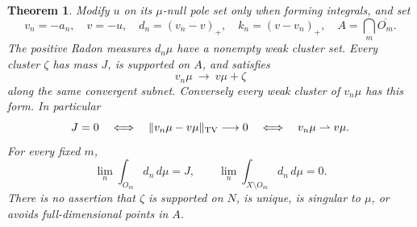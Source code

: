 \documentclass[11pt]{article}
\newtheorem{theorem}{Theorem}
\begin{document}
\begin{theorem}\label{fresh:concentration}
Modify $u$ on its $\mu$-null pole set only when forming integrals, and set
\[
 v_n=-a_n,\quad v=-u,\quad d_n=(v_n-v)_+,\quad k_n=(v-v_n)_+,
 \quad A=\bigcap_m\overline{O_m}.
\]
The positive Radon measures $d_n\mu$ have a nonempty weak cluster set.
Every cluster $\zeta$ has mass $J$, is supported on $A$, and satisfies
\[
 v_n\mu\ \longrightarrow\ v\mu+\zeta
\]
along the same convergent subnet. Conversely every weak cluster of
$v_n\mu$ has this form. In particular
\[
 J=0\quad\Longleftrightarrow\quad
 \|v_n\mu-v\mu\|_{\rm TV}\longrightarrow0
 \quad\Longleftrightarrow\quad v_n\mu\rightharpoonup v\mu.
\]
For every fixed $m$,
\[
 \lim_n\int_{O_m}d_n\,d\mu=J,
 \qquad \lim_n\int_{X\setminus O_m}d_n\,d\mu=0.
\]
There is no assertion that $\zeta$ is supported on $N$, is unique, is
singular to $\mu$, or avoids full-dimensional points in $A$.
\end{theorem}
\end{document}
